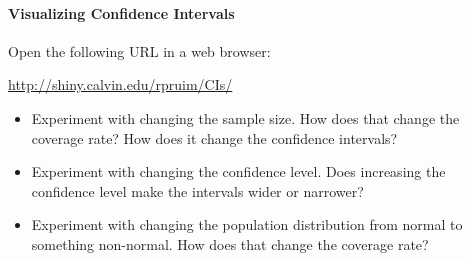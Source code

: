 \documentclass[10pt]{article}\usepackage[]{graphicx}\usepackage[]{color}
\begin{document}
\paragraph{Visualizing Confidence Intervals}

Open the following URL in a web browser:

\begin{center}
  \url{http://shiny.calvin.edu/rpruim/CIs/}
\end{center}

\begin{itemize}
  \itemsep0.25in
  \item Experiment with changing the sample size. How does that change the coverage rate? How does it change the confidence intervals? 
  \item Experiment with changing the confidence level. Does increasing the confidence level make the intervals wider or narrower?
  \item Experiment with changing the population distribution from normal to something non-normal. How does that change the coverage rate? 
  \vspace{0.5in}
\end{itemize}
\end{document}
